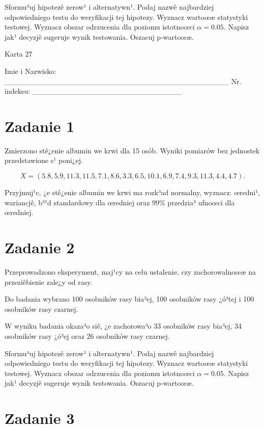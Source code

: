 \documentclass[a4paper,12pt]{article}
\begin{document}
     Sformu³uj hipotezê zerow¹ i alternatywn¹. 
     Podaj nazwê najbardziej odpowiedniego testu do weryfikacji tej hipotezy. 
     Wyznacz wartoœæ statystyki testowej. 
     Wyznacz obszar odrzucenia dla poziomu istotnoœci $\alpha=0.05$. 
     Napisz jak¹ decyzjê sugeruje wynik testowania. 
     Oszacuj p-wartoœæ. \vspace{1cm} 

  \clearpage  Karta  27  

 Imie i Nazwisko: \_\_\_\_\_\_\_\_\_\_\_\_\_\_\_\_\_\_\_\_\_\_\_\_\_\_\_\_\_\_\_\_\_\_\_\_\_\_\_\_\_\_ Nr. indeksu: \_\_\_\_\_\_\_\_\_\_\_\_\_\_\_\_\_\_\_\_\_\_\_\_\_\_\_\_ 
 \section*{Zadanie 1}
     
     Zmierzono stê¿enie albumin we krwi dla 15 osób. 
     Wyniki pomiarów bez jednostek przedstawione s¹ poni¿ej. 
     
     \noindent $$X=(  5.8,  5.9, 11.3, 11.5,  7.1,  8.6,  3.3,  6.5, 10.1,  6.9,  7.4,  9.3, 11.3,  4.4,  4.7 ).$$
     
     Przyjmuj¹c, ¿e stê¿enie albumin we krwi ma rozk³ad normalny, 
     wyznacz: œredni¹, wariancjê, b³¹d standardowy dla œredniej oraz 99\% przedzia³ ufnoœci dla œredniej. \vspace{1cm} 

  \section*{Zadanie 2}
     
  Przeprowadzono eksperyment, maj¹cy na celu ustalenie, czy zachorowalnoœæ na przeziêbienie zale¿y od rasy.
  
  Do badania wybrano 100 osobników rasy bia³ej, 100 osobników rasy ¿ó³tej i 100 osobników rasy czarnej. 
  
  W wyniku badania okaza³o siê, ¿e zachorowa³o 33 osobników rasy bia³ej, 34 osobników rasy ¿ó³ej oraz 26 osobników rasy czarnej. 
  
  Sformu³uj hipotezê zerow¹ i alternatywn¹. 
  Podaj nazwê najbardziej odpowiedniego testu do weryfikacji tej hipotezy. 
  Wyznacz wartoœæ statystyki testowej. 
  Wyznacz obszar odrzucenia dla poziomu istotnoœci $\alpha=0.05$. 
  Napisz jak¹ decyzjê sugeruje wynik testowania. Oszacuj p-wartoœæ. \vspace{1cm} 

  \section*{Zadanie 3}
     
\end{document}
